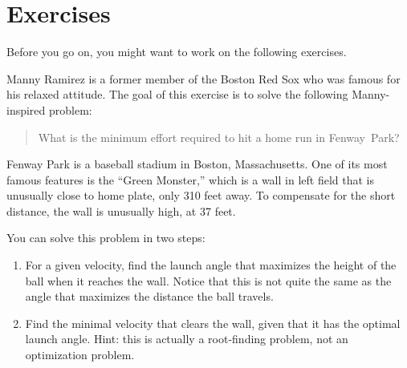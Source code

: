 \documentclass[../../book.tex]{subfiles}
\begin{document}
\section{Exercises}

Before you go on, you might want to work on the following exercises.

\begin{ex}


Manny Ramirez is a former member of the Boston Red Sox who was famous for his relaxed attitude.  The goal of this exercise is to solve the following Manny-inspired problem:

\begin{quote}
What is the minimum effort required to hit a home run in Fenway~Park?
\end{quote}


Fenway Park is a baseball stadium in Boston, Massachusetts.  One of its most famous features is the ``Green Monster,'' which is a wall in left field that is unusually close to home plate, only 310 feet away.  To compensate for the short distance, the wall is unusually high, at 37 feet.


You can solve this problem in two steps:

\begin{enumerate}

\item For a given velocity, find the launch angle that maximizes the height of the ball when it reaches the wall.  Notice that this is not quite the same as the angle that maximizes the distance the ball travels.


\item Find the minimal velocity that clears the wall, given that it has the optimal launch angle.  Hint: this is actually a root-finding problem, not an optimization problem.

\end{enumerate}

\end{ex}
\end{document}
